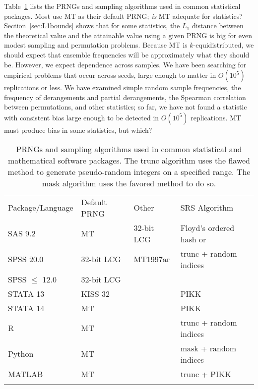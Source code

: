 \documentclass[graybox]{svmult}
\begin{document}
Table~\ref{tab:software} lists the PRNGs and sampling algorithms used in common statistical packages.
Most use MT as their default PRNG; \emph{is} MT adequate for statistics?
Section~\ref{sec:L1bounds} shows that for some statistics, the $L_1$ distance between the theoretical value and the attainable value using a given PRNG
 is big for even modest sampling and permutation problems.
Because MT is $k$-equidistributed, we should expect that ensemble frequencies will be approximately
what they should be.
However, we expect dependence across samples.
We have been searching for empirical problems that occur across seeds, large enough to matter in 
$O(10^5)$ replications or less.
We have examined simple random sample frequencies, the frequency of derangements and partial derangements, the Spearman correlation between permutations, 
and other statistics; so far, we have not found a statistic with consistent
bias large enough to be detected in $O(10^5)$ replications.
MT must produce bias in some statistics, but which?

\begin{table}
\caption{PRNGs and sampling algorithms used in common statistical and mathematical software packages. The trunc algorithm uses the flawed method to generate pseudo-random integers on a specified range. The mask algorithm uses the favored method to do so.}
\label{tab:software}      
\begin{tabular}[h]{p{2.5cm}p{2.4cm}p{2.5cm}p{4cm}}
\hline\noalign{\smallskip}
Package/Language & Default PRNG & Other & SRS Algorithm  \\
\noalign{\smallskip}\svhline\noalign{\smallskip}
SAS 9.2              & MT         	& 32-bit LCG & Floyd's ordered hash or \cite{fan_development_1962} \\
SPSS 20.0          & 32-bit LCG  & MT1997ar  & trunc + random indices \\
SPSS $\le$ 12.0 & 32-bit LCG  &         &                \\
STATA 13            & KISS 32      &         & PIKK           \\
STATA 14            & MT              &         & PIKK           \\
R                         & MT              &         & trunc + random indices \\
Python                 & MT             &         & mask + random indices  \\
MATLAB              & MT             &         & trunc + PIKK         \\
\noalign{\smallskip}\hline\noalign{\smallskip}
\end{tabular}
\end{table}
\end{document}
